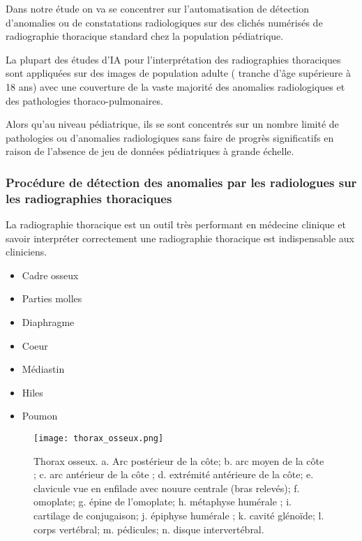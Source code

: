             Dans notre étude on va se concentrer sur l’automatisation de détection d’anomalies ou de constatations radiologiques sur des clichés numérisés de radiographie thoracique standard chez la population pédiatrique.

            La plupart des études d'IA pour l'interprétation des radiographies thoraciques sont appliquées sur des images de population adulte ( tranche d'âge supérieure à 18 ans) avec une couverture de la vaste majorité des anomalies radiologiques et des pathologies thoraco-pulmonaires.

            Alors qu’au niveau pédiatrique, ils se sont concentrés sur un nombre limité de pathologies ou d'anomalies radiologiques sans faire de progrès significatifs en raison de l'absence de  jeu de données  pédiatriques à grande échelle.

            \subsubsection{Procédure de détection des anomalies par les radiologues sur les radiographies thoraciques}
            La radiographie thoracique est un outil très performant en médecine clinique et savoir interpréter correctement une radiographie thoracique est indispensable aux cliniciens.
            \begin{multicols}{2}
                \begin{itemize}[label=$\bullet$]
                    \item Cadre osseux
                    \item Parties molles
                    \item Diaphragme
                    \item Coeur
                    \item Médiastin
                    \item Hiles
                    \item Poumon
                \end{itemize}
            \end{multicols}
            \begin{figure}[h]
                \centering
                \texttt{[image: thorax\_osseux.png]}
                \caption{Thorax osseux. a. Arc postérieur de la côte; b. arc moyen de la côte ; c. arc antérieur de la côte ; d. extrémité antérieure de la côte; e. clavicule vue en enfilade avec nouure centrale (bras relevés); f. omoplate; g. épine de l'omoplate; h. métaphyse humérale ; i. cartilage de conjugaison; j. épiphyse humérale ; k. cavité glénoïde; l. corps vertébral; m. pédicules; n. disque intervertébral.
                }\label{fig:thorax}
            \end{figure}
           
